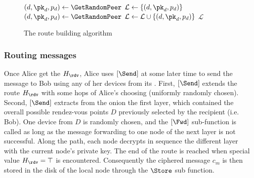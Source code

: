 \begin{figure}[t]

  \vspace{0.3em}

  \begin{algorithmic}[1]
    \Function{\CreateOnionLayer}{\null}
      \State $(d, \pk_d, p_d)\gets \GetRandomPeer$
      \State $\mathcal{L}\gets \{(d, \pk_d, p_d)\}$
        \State $(d, \pk_d, p_d)\gets \GetRandomPeer$
        \State $\mathcal{L}\gets \mathcal{L}\cup \{(d, \pk_d, p_d)\}$
      \EndWhile
      \State \Return $\mathcal{L}$
    \EndFunction
  \end{algorithmic}
  \caption{\label{fig:route building algo}The route building algorithm}
\end{figure}

\subsubsection{Routing messages}
\label{ssub:routing_messages}


Once Alice get the \(H_\rdv\), Alice uses \([\Send]\) at some
later time to send the message to Bob using any of her devices from
its \squad.%
First, \([\Send]\) extends the route
\(H_\rdv\) with some hops of Alice's choosing (uniformly randomly
chosen). Second, \([\Send]\) extracts from the onion the first
layer, which contained the overall
possible rendez-vous points $D$ previously selected by the recipient (i.e. Bob).
One device from $D$ is randomly chosen, and the \([\Fwd]\)
sub-function is called as long as the message forwarding to one node of
the next layer is not successful.%
Along the path, each node decrypts
in sequence the different layer with the current node’s private key. 
The end of the route is reached when special value \(H_\rdv = \top\) is
encountered. Consequently the ciphered message \(c_m\) is then stored
in the disk of the local node through the \(\Store\) sub function.%

